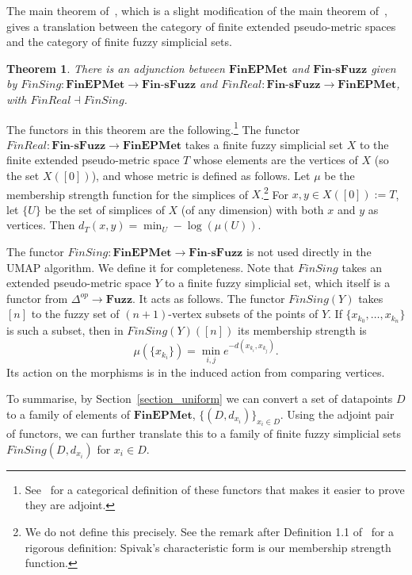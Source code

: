 \documentclass[a4paper,11pt,leqno]{article} \usepackage{amsmath}
\newtheorem*{thm}{Theorem}
\theoremstyle{definition}
\begin{document}
The main theorem of~\cite{McInnes18}, which is a slight modification of the main
theorem of~\cite{Spivak}, gives a translation between the category of finite
extended pseudo-metric spaces and the category of finite fuzzy simplicial sets.

\begin{thm} There is an adjunction between $\textbf{FinEPMet}$ and
  $\textbf{Fin-sFuzz}$ given by $FinSing: \textbf{FinEPMet}\to
  \textbf{Fin-sFuzz}$ and $FinReal: \textbf{Fin-sFuzz}\to \textbf{FinEPMet}$,
  with $FinReal\dashv FinSing$.
\end{thm}

The functors in this theorem are the following.\footnote{
  See~\cite[Section 2]{McInnes18} for a categorical definition of
  these functors that makes it easier to prove they are adjoint.
}
The functor $FinReal: \textbf{Fin-sFuzz}\to\textbf{FinEPMet}$ takes a finite
fuzzy simplicial set $X$ to the finite extended pseudo-metric space $T$ whose
elements are the vertices of $X$ (so the set $X([0])$), and whose metric is
defined as follows.
Let $\mu$ be the membership strength function for the simplices of $X$.\footnote{
  We do not define this precisely.
  See the remark after Definition 1.1 of~\cite{Spivak} for a rigorous
  definition: Spivak's characteristic form is our membership strength function.
}
For $x, y\in X([0]) := T$, let $\{U\}$ be the set of simplices of $X$ (of any
dimension) with both $x$ and $y$ as vertices.
Then $d_T(x, y) = \min_{U}-\log(\mu(U)).$

The functor $FinSing: \textbf{FinEPMet}\to\textbf{Fin-sFuzz}$ is not used
directly in the UMAP algorithm.
We define it for completeness.
Note that $FinSing$ takes an extended pseudo-metric space $Y$ to a finite fuzzy
simplicial set, which itself is a functor from $\Delta^{op}\to \textbf{Fuzz}$.
It acts as follows.
The functor $FinSing(Y)$ takes $[n]$ to the fuzzy set of $(n+1)$-vertex subsets
of the points of $Y$.
If $\{x_{k_0},\ldots,x_{k_n}\}$ is such a subset, then in $FinSing(Y)([n])$ its
membership strength is
$$\mu(\{x_{k_i}\}) = \min_{i,j} e^{-d(x_{k_i}, x_{k_j})}.$$
Its action on the morphisms is in the induced action from comparing vertices.

To summarise, by Section~\ref{section_uniform} we can convert a set of
datapoints $D$ to a family of elements of $\textbf{FinEPMet}$, $\{(D,
d_{x_i})\}_{x_i\in D}$.
Using the adjoint pair of functors, we can further translate this to a family
of finite fuzzy simplicial sets $FinSing(D, d_{x_i})$ for $x_i\in D$.
\end{document}
